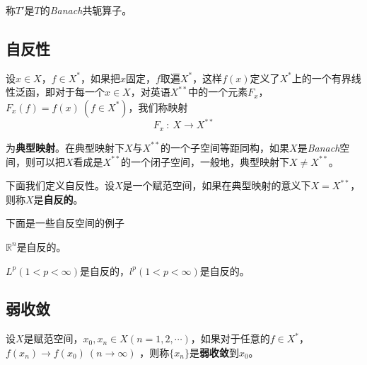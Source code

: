 称$T'$是$T$的\textsl{Banach}共轭算子。

\subsection*{自反性}

设$x\in X$，$f\in X^*$，如果把$x$固定，$f$取遍$X^*$，这样$f(x)$定义了$X^*$上的一个有界线性泛函，即对于每一个$x\in X$，对英语$X^{**}$中的一个元素$F_x$，$F_x(f)=f(x)\ (f\in X^*)$，我们称映射
\begin{equation}
    F_x\ :\ X\rightarrow X^{**}
\end{equation}

为\textbf{典型映射}。在典型映射下$X$与$X^{**}$的一个子空间等距同构，如果$X$是\textsl{Banach}空间，则可以把$X$看成是$X^{**}$的一个闭子空间，一般地，典型映射下$X\neq X^{**}$。

下面我们定义自反性。设$X$是一个赋范空间，如果在典型映射的意义下$X=X^{**}$，则称$X$是\textbf{自反的}。

下面是一些自反空间的例子
\begin{example}
    $\mathbb{R}^n$是自反的。
\end{example}
\begin{example}
    $L^p(1<p<\infty)$是自反的，$l^p(1<p<\infty)$是自反的。
\end{example}

\subsection*{弱收敛}

设$X$是赋范空间，$x_0,x_n\in X(n=1,2,\cdots)$，如果对于任意的$f\in X^*$，$f(x_n)\rightarrow f(x_0)\ (n\rightarrow \infty)$
，则称$\{x_n\}$是\textbf{弱收敛}到$x_0$。

